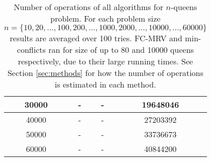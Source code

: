 \begin{table}[htpb]
{\begin{tabular}{| c | c | c | c |}
\hline
30000 & - & - & 19648046\\ 
\hline
40000 & - & - & 27203392\\
\hline
50000 & - & - & 33736673\\
\hline
60000 & - & - & 40844200\\
\hline
\end{tabular}
}%
\caption{Number of operations of all algorithms for $n$-queens problem. For each problem size $n = \{10, 20,..., 100, 200,..., 1000, 2000,..., 10000,..., 60000\}$ results are averaged over 100 tries. FC-MRV and min-conflicts ran for size of up to 80 and 10000 queens respectively, due to their large running times. See Section \ref{sec:methods} for how the number of operations is estimated in each method.}
\label{table:operations}
\end{table}




